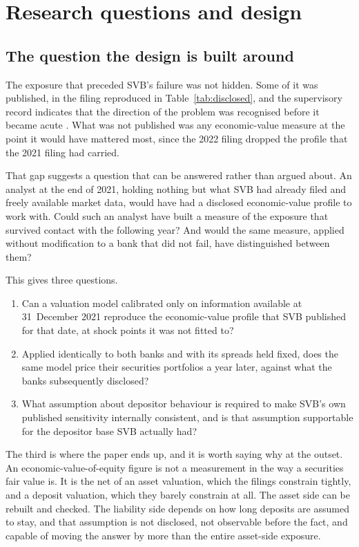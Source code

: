 \section{Research questions and design}
\label{sec:design}

\subsection{The question the design is built around}

The exposure that preceded SVB's failure was not hidden. Some of it was published,
in the filing reproduced in Table~\ref{tab:disclosed}, and the supervisory record
indicates that the direction of the problem was recognised before it became acute
\citep{FRB2023}. What was not published was any economic-value measure at the
point it would have mattered most, since the 2022 filing dropped the profile that
the 2021 filing had carried.

That gap suggests a question that can be answered rather than argued about. An
analyst at the end of 2021, holding nothing but what SVB had already filed and
freely available market data, would have had a disclosed economic-value profile
to work with. Could such an analyst have built a measure of the exposure that
survived contact with the following year? And would the same measure, applied
without modification to a bank that did not fail, have distinguished between
them?

This gives three questions.

\begin{enumerate}
\item Can a valuation model calibrated only on information available at
31~December 2021 reproduce the economic-value profile that SVB published for that
date, at shock points it was not fitted to?
\item Applied identically to both banks and with its spreads held fixed, does the
same model price their securities portfolios a year later, against what the banks
subsequently disclosed?
\item What assumption about depositor behaviour is required to make SVB's own
published sensitivity internally consistent, and is that assumption supportable
for the depositor base SVB actually had?
\end{enumerate}

The third is where the paper ends up, and it is worth saying why at the outset.
An economic-value-of-equity figure is not a measurement in the way a securities
fair value is. It is the net of an asset valuation, which the filings constrain
tightly, and a deposit valuation, which they barely constrain at all. The
asset side can be rebuilt and checked. The liability side depends on how long
deposits are assumed to stay, and that assumption is not disclosed, not
observable before the fact, and capable of moving the answer by more than the
entire asset-side exposure.

